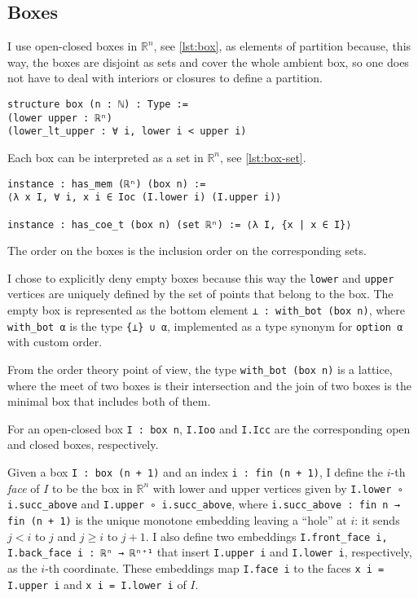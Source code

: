 \documentclass[a4paper, UKenglish,cleveref, autoref, thm-restate]{lipics-v2021}
\newcommand{\bbR}{\mathbb{R}}
\begin{document}
\subsection{Boxes}\label{sec:boxes}

I use open-closed boxes in \(\bbR^{n}\), see \autoref{lst:box}, as
elements of partition because, this way, the boxes are disjoint as
sets and cover the whole ambient box, so one does not have to deal
with interiors or closures to define a partition.

\begin{lstlisting}[caption={Definition of a box}, label=lst:box]
structure box (n : ℕ) : Type :=
(lower upper : ℝⁿ)
(lower_lt_upper : ∀ i, lower i < upper i)
\end{lstlisting}

Each box can be interpreted as a set in \(\bbR^{n}\), see \autoref{lst:box-set}.
\begin{lstlisting}[caption={Box as a set}, label=lst:box-set]
instance : has_mem (ℝⁿ) (box n) :=
⟨λ x I, ∀ i, x i ∈ Ioc (I.lower i) (I.upper i)⟩

instance : has_coe_t (box n) (set ℝⁿ) := ⟨λ I, {x | x ∈ I}⟩
\end{lstlisting}
The order on the boxes is the inclusion order on the corresponding
sets.

I chose to explicitly deny empty boxes because this way the
\lstinline{lower} and \lstinline{upper} vertices are uniquely defined
by the set of points that belong to the box. The empty box is
represented as the bottom element \lstinline{⊥ : with_bot (box n)},
where \lstinline{with_bot α} is the type \lstinline={⊥} ∪ α=,
implemented as a type synonym for \lstinline{option α} with custom order.

From the order theory point of view, the type
\lstinline=with_bot (box n)= is a lattice, where the meet of two boxes
is their intersection and the join of two boxes is the minimal box
that includes both of them.

For an open-closed box \lstinline{I : box n}, \lstinline{I.Ioo} and
\lstinline{I.Icc} are the corresponding open and closed boxes,
respectively.

Given a box \lstinline=I : box (n + 1)= and an index
\lstinline=i : fin (n + 1)=, I define the \(i\)-th \emph{face} of
\(I\) to be the box in \(\bbR^{n}\) with lower and upper vertices given by
\lstinline=I.lower ∘ i.succ_above= and
\lstinline=I.upper ∘ i.succ_above=, where
\lstinline=i.succ_above : fin n → fin (n + 1)= is the unique monotone
embedding leaving a \enquote{hole} at \(i\): it sends \(j<i\) to \(j\)
and \(j\ge i\) to \(j+1\). I also define two embeddings
\lstinline=I.front_face i, I.back_face i : ℝⁿ → ℝⁿ⁺¹= that insert
\lstinline=I.upper i= and \lstinline=I.lower i=, respectively, as the
\(i\)-th coordinate. These embeddings map \lstinline=I.face i= to
the faces \lstinline+x i = I.upper i+ and \lstinline+x i = I.lower i+
of \(I\).
\end{document}
